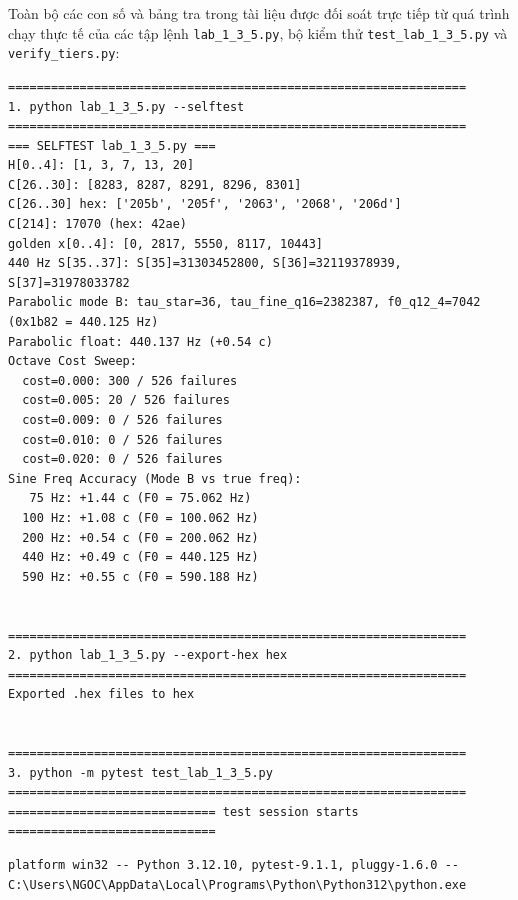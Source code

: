 \documentclass[11pt,a4paper]{article}
\begin{document}
Toàn bộ các con số và bảng tra trong tài liệu được đối soát trực tiếp từ quá trình chạy thực tế của các tập lệnh \texttt{lab\_1\_3\_5.py}, bộ kiểm thử \texttt{test\_lab\_1\_3\_5.py} và \texttt{verify\_tiers.py}:

\begin{scriptsize}
\begin{verbatim}
================================================================
1. python lab_1_3_5.py --selftest
================================================================
=== SELFTEST lab_1_3_5.py ===
H[0..4]: [1, 3, 7, 13, 20]
C[26..30]: [8283, 8287, 8291, 8296, 8301]
C[26..30] hex: ['205b', '205f', '2063', '2068', '206d']
C[214]: 17070 (hex: 42ae)
golden x[0..4]: [0, 2817, 5550, 8117, 10443]
440 Hz S[35..37]: S[35]=31303452800, S[36]=32119378939, S[37]=31978033782
Parabolic mode B: tau_star=36, tau_fine_q16=2382387, f0_q12_4=7042 (0x1b82 = 440.125 Hz)
Parabolic float: 440.137 Hz (+0.54 c)
Octave Cost Sweep:
  cost=0.000: 300 / 526 failures
  cost=0.005: 20 / 526 failures
  cost=0.009: 0 / 526 failures
  cost=0.010: 0 / 526 failures
  cost=0.020: 0 / 526 failures
Sine Freq Accuracy (Mode B vs true freq):
   75 Hz: +1.44 c (F0 = 75.062 Hz)
  100 Hz: +1.08 c (F0 = 100.062 Hz)
  200 Hz: +0.54 c (F0 = 200.062 Hz)
  440 Hz: +0.49 c (F0 = 440.125 Hz)
  590 Hz: +0.55 c (F0 = 590.188 Hz)


================================================================
2. python lab_1_3_5.py --export-hex hex
================================================================
Exported .hex files to hex


================================================================
3. python -m pytest test_lab_1_3_5.py
================================================================
============================= test session starts =============================
\end{verbatim}
\end{scriptsize}
{\tiny
\begin{verbatim}
platform win32 -- Python 3.12.10, pytest-9.1.1, pluggy-1.6.0 -- C:\Users\NGOC\AppData\Local\Programs\Python\Python312\python.exe
\end{verbatim}
}
\end{document}
